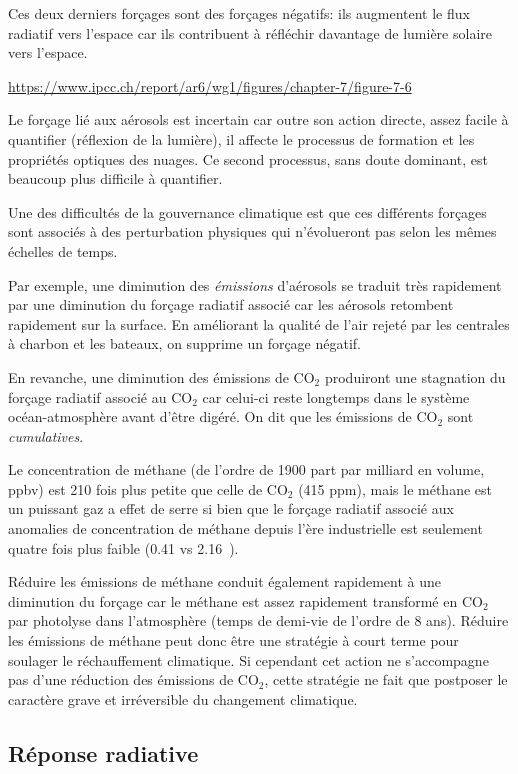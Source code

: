 Ces deux derniers forçages sont des forçages négatifs: ils augmentent le flux radiatif vers l'espace car ils contribuent à réfléchir davantage de lumière solaire vers l'espace. 

\url{https://www.ipcc.ch/report/ar6/wg1/figures/chapter-7/figure-7-6}

Le forçage lié aux aérosols est incertain car outre son action directe, assez facile à quantifier (réflexion de la lumière), il affecte le processus de formation et les propriétés optiques des nuages. Ce second processus, sans doute dominant, est beaucoup plus difficile à quantifier. 

Une des difficultés de la gouvernance climatique est que ces différents forçages sont associés à des perturbation physiques qui n'évolueront pas selon les mêmes échelles de temps. 

Par exemple, une diminution des \emph{émissions} d'aérosols se traduit très rapidement par une diminution du forçage radiatif associé car les aérosols retombent rapidement sur la surface. En améliorant la qualité de l'air rejeté par les centrales à charbon et les bateaux, on supprime un forçage négatif. 


En revanche, une diminution des émissions de CO$_2$ produiront une stagnation du forçage radiatif associé au CO$_2$ car celui-ci reste longtemps dans le système océan-atmosphère avant d'être digéré. On dit que les émissions de CO$_2$ sont \emph{cumulatives}. 

Le concentration de méthane (de l'ordre de 1900 part par milliard en volume, ppbv) est 210 fois plus petite que celle de CO$_2$ (415 ppm), mais le méthane est un puissant gaz a effet de serre si bien que le forçage radiatif associé aux anomalies de concentration de méthane depuis l'ère industrielle est seulement quatre fois plus faible (0.41 vs 2.16\ \wmm). 

Réduire les émissions de méthane conduit également rapidement à une diminution du forçage car le méthane est assez rapidement transformé en CO$_2$ par photolyse dans l'atmosphère (temps de demi-vie de l'ordre de 8 ans). Réduire les émissions de méthane peut donc être une stratégie à court terme pour soulager le réchauffement climatique. Si cependant cet action ne s'accompagne pas d'une réduction des émissions de CO$_2$, cette stratégie ne fait que postposer le caractère grave et irréversible du changement climatique. 

\subsection{Réponse radiative}


